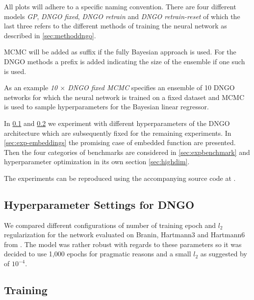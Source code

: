 \documentclass[conference,compsoc]{IEEEtran}
\theoremstyle{definition}
\begin{document}

    All plots will adhere to a specific naming convention.
    There are four different models \emph{GP}, \emph{DNGO fixed}, \emph{DNGO retrain} and \emph{DNGO retrain-reset} of which the last three refers to the different methods of training the neural network as described in \cref{sec:methoddngo}.
    
    MCMC will be added as suffix if the fully Bayesian approach is used.
    For the DNGO methods a prefix is added indicating the size of the ensemble if one such is used.
    
    As an example \emph{10 $\times$ DNGO fixed MCMC} specifies an ensemble of 10 DNGO networks for which the neural network is trained on a fixed dataset and MCMC is used to sample hyperparameters for the Bayesian linear regressor.
 
    In \cref{sec:exp-dngo} and \cref{sec:exp-training} we experiment with different hyperparameters of the DNGO architecture which are subsequently fixed for the remaining experiments.
    In \cref{sec:exp-embeddings} the promising case of embedded function are presented.
    Then the four categories of benchmarks are considered in \cref{sec:expbenchmark} and hyperparameter optimization in its own section \cref{sec:highdim}.

    The experiments can be reproduced using the accompanying source code at \parencite{thomas_m._pethick_ensembled_2018}.

    \subsection{Hyperparameter Settings for DNGO}\label{sec:exp-dngo}

        We compared different configurations of number of training epoch and $l_2$ regularization for the network evaluated on Branin, Hartmann3 and Hartmann6 from \parencite{eggensperger_towards_2013}.
        The model was rather robust with regards to these parameters so it was decided to use 1,000 epochs for pragmatic reasons and a small $l_2$ as suggested by \parencite{snoek_scalable_2015} of $10^{-4}$.

    \subsection{Training}\label{sec:exp-training}
\end{document}
